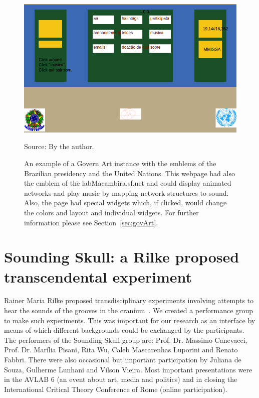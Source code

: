 \begin{apendicesenv}
\begin{figure}[h!]
\begin{center}
\includegraphics[scale=.45]{figs/govArt}
\caption{An example of a Govern Art instance with the emblems of the Brazilian presidency and the United Nations.
	This webpage had also the emblem of the labMacambira.sf.net and could display animated networks and play music by mapping network structures to sound.
	Also, the page had special widgets which, if clicked, would change the colors and layout and individual widgets.
	For further information please see Section~\ref{sec:govArt}.}
\label{fig:gart}
\begin{flushleft}\footnotesize
Source: By the author.\
\end{flushleft}
\end{center}
\end{figure}
\section{Sounding Skull: a Rilke proposed transcendental experiment}\label{sec:soundSkull}
Rainer Maria Rilke proposed transdisciplinary experiments involving attempts to hear the
sounds of the grooves in the cranium~\cite{rilke}.
We created a performance group to make such experiments.
This was important for our research as an interface
by means of which different backgrounds could be exchanged by the participants.
The performers of the Sounding Skull group are:
Prof. Dr. Massimo Canevacci, Prof. Dr. Marília Pisani,
Rita Wu, Caleb Mascarenhas Luporini and Renato Fabbri.
There were also occasional but important participation
by Juliana de Souza, Gulherme Lunhani and Vilson Vieira.
Most important presentations were in the AVLAB 6 (an event about art, media and politics)
and in closing the International Critical Theory Conference of Rome (online participation).


\end{apendicesenv}
